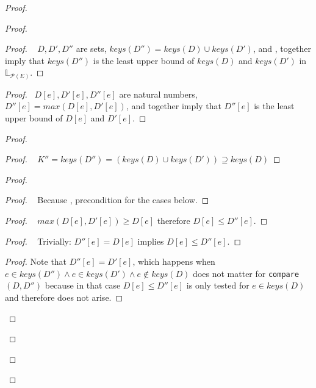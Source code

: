 \documentclass[11pt, oneside]{article}   	%
\begin{document}
\begin{proof}
\begin{proof}
		
		\begin{proof}
			\pf~ $D, D', D''$ are sets, $\textit{keys}(D'') = \textit{keys}(D) \cup \textit{keys}(D')$, and , together imply that $\textit{keys}(D'')$ is the least upper bound of $\textit{keys}(D)$ and $\textit{keys}(D')$ in $\mathds{L}_{\mathcal{P}(E)}$.
		\end{proof}
		
		\begin{proof}
			\pf~$D[e], D'[e], D''[e]$ are natural numbers, $D''[e] = \textit{max}(D[e], D'[e])$, and  together imply that $D''[e]$ is the least upper bound of $D[e]$ and $D'[e]$.
		\end{proof}
		
		\begin{proof}
			\begin{proof}
				\pf~ $K'' = \textit{keys}(D'') = (\textit{keys}(D) \cup \textit{keys}(D')) \supseteq \textit{keys}(D)$
			\end{proof}
		
			\begin{proof}
				\begin{proof}
					\pf~ Because , precondition for the cases below.
				\end{proof}
				
				\begin{proof}
					\pf~  $\textit{max}(D[e], D'[e]) \geq D[e]$ therefore $D[e] \leq D''[e]$.
				\end{proof}
				
				\begin{proof}
					\pf~  Trivially: $D''[e] = D[e]$ implies $D[e] \leq D''[e]$.
				\end{proof}
				
				\qedstep
				\begin{proof}
				 	Note that $D''[e] = D'[e]$, which happens when $e \in \textit{keys}(D'') \wedge e \in \textit{keys}(D') \wedge e \notin \textit{keys}(D)$ does not matter for \texttt{compare}$(D, D'')$ because in that case $D[e] \leq D''[e]$ is only tested for $e \in \textit{keys}(D)$ and therefore does not arise.
				\end{proof}
			\end{proof}
		\end{proof}
		

\end{proof}
\end{proof}
\end{document}
